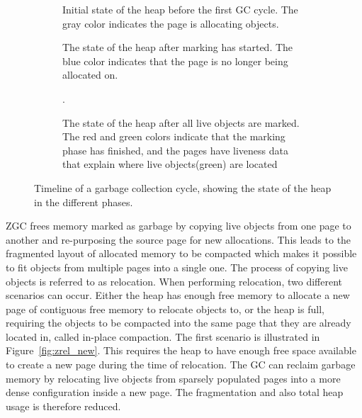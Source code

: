 \vspace*{-0.4cm}

\begin{figure}[H]
    \centering
    \begin{subfigure}[t]{.214\textwidth}
        \centering
        
        \caption{Initial state of the heap before the first GC cycle. The gray color indicates the page is allocating objects.}
        \label{fig:zrel1}
    \end{subfigure}
    \hfill\vline\hfill
    \begin{subfigure}[t]{.32\textwidth}
        \centering
        
        \caption{The state of the heap after marking has started. The blue color indicates that the page is no longer being allocated on.}
        \label{fig:zrel2}
    \end{subfigure}
    \hfill\vline\hfill
    \begin{subfigure}[t]{.32\textwidth}
        \centering
        
        \caption{The state of the heap after all live objects are marked. The red and green colors indicate that the marking phase has finished, and the pages have liveness data that explain where live objects(green) are located}.
        \label{fig:zrel3}
    \end{subfigure}
    \caption{Timeline of a garbage collection cycle, showing the state of the heap in the different phases.}
    \label{fig:zgc_timeline}
\end{figure}

\vspace*{-0.49cm}

ZGC frees memory marked as garbage by copying live objects from one page to another and re-purposing the source page for new allocations. This leads to the fragmented layout of allocated memory to be compacted which makes it possible to fit objects from multiple pages into a single one. The process of copying live objects is referred to as relocation. When performing relocation, two different scenarios can occur. Either the heap has enough free memory to allocate a new page of contiguous free memory to relocate objects to, or the heap is full, requiring the objects to be compacted into the same page that they are already located in, called in-place compaction. The first scenario is illustrated in Figure~\ref{fig:zrel_new}. This requires the heap to have enough free space available to create a new page during the time of relocation. The GC can reclaim garbage memory by relocating live objects from sparsely populated pages into a more dense configuration inside a new page. The fragmentation and also total heap usage is therefore reduced.

